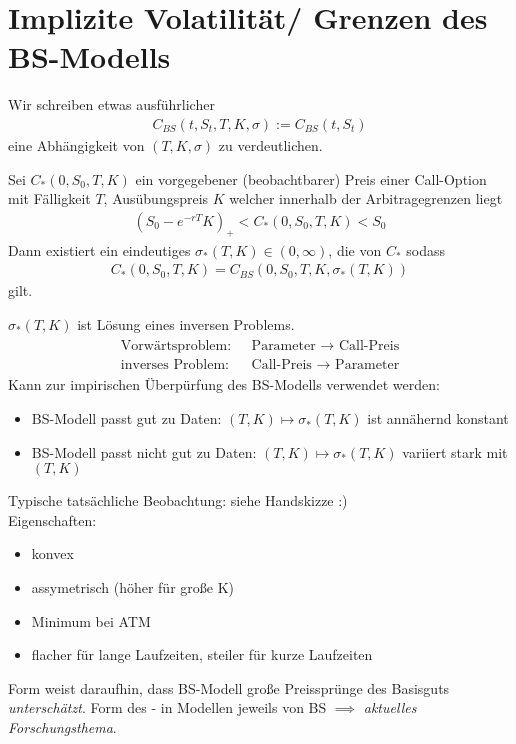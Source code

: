 \section{Implizite Volatilität/ Grenzen des BS-Modells}
Wir schreiben etwas ausführlicher
\begin{align*}
C_{BS}(t,S_t, T, K, \sigma) := C_{BS}(t, S_t)
\end{align*}
eine Abhängigkeit von $(T,K,\sigma)$ zu verdeutlichen.
\begin{theorem} %
	Sei $C_{\ast}(0,S_0,T, K)$ ein vorgegebener (beobachtbarer) Preis einer Call-Option mit Fälligkeit $T$, Ausübungspreis $K$ welcher innerhalb der Arbitragegrenzen liegt
	\begin{align*}
	(S_0 - e^{-rT}K)_+ < C_{\ast}(0,S_0, T,K) < S_0
	\end{align*}
	Dann existiert ein eindeutiges $\sigma_{\ast}(T, K) \in (0,\infty)$, die  von $C_{\ast}$ sodass
	\begin{align*}
	C_{\ast}(0,S_0, T,K) = C_{BS}(0,S_0,T,K, \sigma_{\ast}(T,K))
	\end{align*}
	gilt.
\end{theorem}
\begin{*remark}
	$\sigma_{\ast}(T,K)$ ist Lösung eines inversen Problems.
	\begin{align*}
	\begin{matrix}
	\text{Vorwärtsproblem: } & \text{ Parameter }\to \text{ Call-Preis}\\
	\text{inverses Problem: } & \text{ Call-Preis }\to \text{ Parameter}
	\end{matrix}
	\end{align*}
	Kann zur impirischen Überpürfung des BS-Modells verwendet werden:
	\begin{itemize}
		\item BS-Modell passt gut zu Daten: $(T,K) \mapsto \sigma_{\ast}(T,K)$ ist annähernd konstant
		\item BS-Modell passt nicht gut zu Daten: $(T,K) \mapsto \sigma_{\ast}(T,K)$ variiert stark mit $(T,K)$
	\end{itemize}
\end{*remark}
Typische tatsächliche Beobachtung: siehe Handskizze :)\\
Eigenschaften:
\begin{itemize}
	\item konvex
	\item assymetrisch (höher für große K)
	\item Minimum bei ATM
	\item flacher für lange Laufzeiten, steiler für kurze Laufzeiten
\end{itemize}
Form weist daraufhin, dass BS-Modell große Preissprünge des Basisguts \emph{unterschätzt}. Form des - in Modellen jeweils von BS $\implies$ \emph{aktuelles Forschungsthema}.